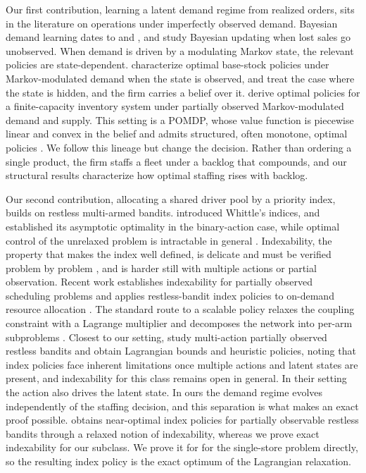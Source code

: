 \documentclass[preprint,11pt,authoryear]{elsarticle}
\theoremstyle{remark}
\begin{document}
Our first contribution, learning a latent demand regime from realized orders, sits in the literature on operations under imperfectly observed demand. Bayesian demand learning dates to \citet{Scarf1959} and \citet{Azoury1985}, and \citet{LariviereePorteus1999} study Bayesian updating when lost sales go unobserved. When demand is driven by a modulating Markov state, the relevant policies are state-dependent. \citet{SongZipkin1993} characterize optimal base-stock policies under Markov-modulated demand when the state is observed, and \citet{treharne2002adaptive} treat the case where the state is hidden, and the firm carries a belief over it. \citet{ArifogluOzekici2010} derive optimal policies for a finite-capacity inventory system under partially observed Markov-modulated demand and supply. This setting is a POMDP, whose value function is piecewise linear and convex in the belief \citep{sondik1978optimal} and admits structured, often monotone, optimal policies \citep{Lovejoy1987}. We follow this lineage but change the decision. Rather than ordering a single product, the firm staffs a fleet under a backlog that compounds, and our structural results characterize how optimal staffing rises with backlog.

Our second contribution, allocating a shared driver pool by a priority index, builds on restless multi-armed bandits. \citet{whittle1988restless} introduced Whittle's indices, and \citet{weber1990index} established its asymptotic optimality in the binary-action case, while optimal control of the unrelaxed problem is intractable in general \citep{PapadimitriouTsitsiklis1999}. Indexability, the property that makes the index well defined, is delicate and must be verified problem by problem \citep{NinoMora2001}, and is harder still with multiple actions \citep{HodgeGlazebrook2015} or partial observation. Recent work establishes indexability for partially observed scheduling problems \citep{Wang2026} and applies restless-bandit index policies to on-demand resource allocation \citep{Fu2025}. The standard route to a scalable policy relaxes the coupling constraint with a Lagrange multiplier and decomposes the network into per-arm subproblems \citep{Hawkins2003}. Closest to our setting, \citet{MeshramKaza2025} study multi-action partially observed restless bandits and obtain Lagrangian bounds and heuristic policies, noting that index policies face inherent limitations once multiple actions and latent states are present, and indexability for this class remains open in general. In their setting the action also drives the latent state. In ours the demand regime evolves independently of the staffing decision, and this separation is what makes an exact proof possible. \citet{Liu2025relaxed} obtains near-optimal index policies for partially observable restless bandits through a relaxed notion of indexability, whereas we prove exact indexability for our subclass. We prove it for for the single-store problem directly, so the resulting index policy is the exact optimum of the Lagrangian relaxation.
\end{document}
